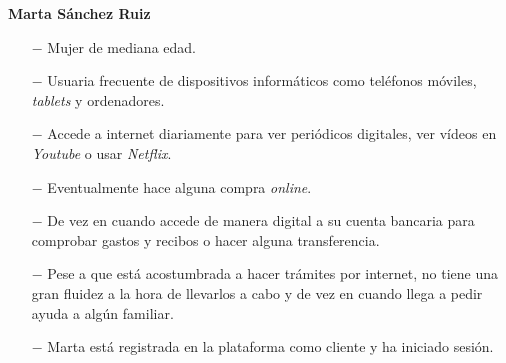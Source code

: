 \documentclass[pdftex,11pt,a4paper]{book}
\begin{document}
\textbf{Marta Sánchez Ruiz}
\vspace{-6mm}
\begin{itemize}
\addtolength{\itemsep}{-2mm}
\item [$-$] Mujer de mediana edad. 
\item [$-$] Usuaria frecuente de dispositivos informáticos como teléfonos móviles, \textit{tablets} y ordenadores.
\item [$-$] Accede a internet diariamente para ver periódicos digitales, ver vídeos en \textit{Youtube} o usar \textit{Netflix}.
\item [$-$] Eventualmente hace alguna compra \textit{online}.
\item [$-$] De vez en cuando accede de manera digital a su cuenta bancaria para comprobar gastos y recibos o hacer alguna transferencia.
\item [$-$] Pese a que está acostumbrada a hacer trámites por internet, no tiene una gran fluidez a la hora de llevarlos a cabo y de vez en cuando llega a pedir ayuda a algún familiar.
\item [$-$] Marta está registrada en la plataforma como cliente y ha iniciado sesión.
\end{itemize}

\renewcommand{\tablename}{Tabla}
\renewcommand{\arraystretch}{1,7}
\end{document}
